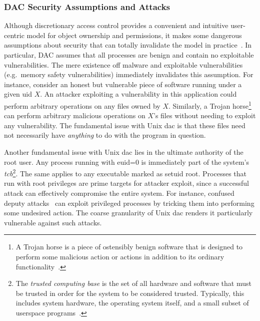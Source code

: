 \subsubsection*{DAC Security Assumptions and Attacks}

Although discretionary access control provides a convenient and intuitive user-centric
model for object ownership and permissions, it makes some dangerous assumptions about
security that can totally invalidate the model in
practice~\cite{shu2016_security_isolation_study}. In particular, DAC assumes that all
processes are benign and contain no exploitable vulnerabilities. The mere existence off
malware and exploitable vulnerabilities (e.g.~memory safety vulnerabilities) immediately
invalidates this assumption. For instance, consider an honest but vulnerable piece of
software running under a given \gls{uid} $X$. An attacker exploiting a vulnerability in
this application could perform arbitrary operations on any files owned by $X$. Similarly,
a Trojan horse\footnote{A Trojan horse is a piece of ostensibly benign software that
is designed to perform some malicious action or actions in addition to its ordinary
functionality~\cite{van_oorschot2020_tools_jewels}.}~\cite{shu2016_security_isolation_study,
van_oorschot2020_tools_jewels} can perform arbitrary malicious operations on $X$'s files
without needing to exploit any vulnerability. The fundamental issue with Unix \gls{dac} is
that these files need not necessarily have \textit{anything} to do with the program in
question.

Another fundamental issue with Unix \gls{dac} lies in the ultimate authority of the root
user. Any process running with \gls{euid}=0 is immediately part of the system's
\textit{\gls{tcb}}\footnote{The \textit{trusted computing base} is the set of all hardware
and software that must be trusted in order for the system to be considered trusted.
Typically, this includes system hardware, the operating system itself, and a small subset
of userspace programs~\cite{jaeger2008_os_security}.}. The same applies to any executable
marked as setuid root. Processes that run with root privileges are prime targets for
attacker exploit, since a successful attack can effectively compromise the entire system.
For instance, confused deputy attacks~\cite{hardy1988_confused_deputy,
shu2016_security_isolation_study} can exploit privileged processes by tricking them into
performing some undesired action. The coarse granularity of Unix \gls{dac} renders it
particularly vulnerable against such attacks.

